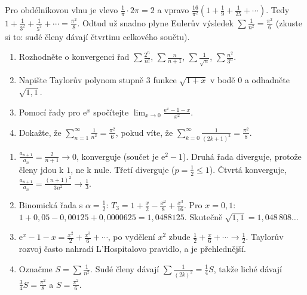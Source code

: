 Pro obdélníkovou vlnu je vlevo $\frac{1}{\pi}\cdot 2\pi = 2$ a vpravo $\frac{16}{\pi^2}\left(1 + \frac{1}{9} + \frac{1}{25} + \cdots\right)$. Tedy $1 + \frac{1}{3^2} + \frac{1}{5^2} + \cdots = \frac{\pi^2}{8}$. Odtud už snadno plyne Eulerův výsledek $\sum\frac{1}{n^2} = \frac{\pi^2}{6}$ (zkuste si to: sudé členy dávají čtvrtinu celkového součtu).

\begin{problem}
  \begin{enumerate}[label=(\alph*)]
    \item Rozhodněte o konvergenci řad $\sum\frac{2^n}{n!}$, $\sum\frac{n}{n + 1}$, $\sum\frac{1}{\sqrt{n}}$, $\sum\frac{n^2}{3^n}$.
    \item Napište Taylorův polynom stupně $3$ funkce $\sqrt{1 + x}$ v bodě $0$ a odhadněte $\sqrt{1{,}1}$.
    \item Pomocí řady pro $\mathrm{e}^x$ spočítejte $\lim_{x\to 0}\frac{\mathrm{e}^x - 1 - x}{x^2}$.
    \item Dokažte, že $\sum_{n=1}^{\infty}\frac{1}{n^2} = \frac{\pi^2}{6}$, pokud víte, že $\sum_{k=0}^{\infty}\frac{1}{{(2k + 1)}^2} = \frac{\pi^2}{8}$.
  \end{enumerate}
\end{problem}

\begin{solution}
  \begin{enumerate}[label=(\alph*)]
    \item $\frac{a_{n+1}}{a_n} = \frac{2}{n + 1}\to 0$, konverguje (součet je $\mathrm{e}^2 - 1$). Druhá řada diverguje, protože členy jdou k $1$, ne k nule. Třetí diverguje ($p = \frac{1}{2}\leq 1$). Čtvrtá konverguje, $\frac{a_{n+1}}{a_n} = \frac{{(n + 1)}^2}{3n^2}\to\frac{1}{3}$.
    \item Binomická řada s $\alpha = \frac{1}{2}$: $T_3 = 1 + \frac{x}{2} - \frac{x^2}{8} + \frac{x^3}{16}$. Pro $x = 0{,}1$: $1 + 0{,}05 - 0{,}00125 + 0{,}0000625 = 1{,}0488125$. Skutečně $\sqrt{1{,}1} = 1{,}048\,808\ldots$
    \item $\mathrm{e}^x - 1 - x = \frac{x^2}{2} + \frac{x^3}{6} + \cdots$, po vydělení $x^2$ zbude $\frac{1}{2} + \frac{x}{6} + \cdots\to\frac{1}{2}$. Taylorův rozvoj často nahradí L'Hospitalovo pravidlo, a je přehlednější.
    \item Označme $S = \sum\frac{1}{n^2}$. Sudé členy dávají $\sum\frac{1}{{(2k)}^2} = \frac{1}{4}S$, takže liché dávají $\frac{3}{4}S = \frac{\pi^2}{8}$ a $S = \frac{\pi^2}{6}$.
  \end{enumerate}
\end{solution}

